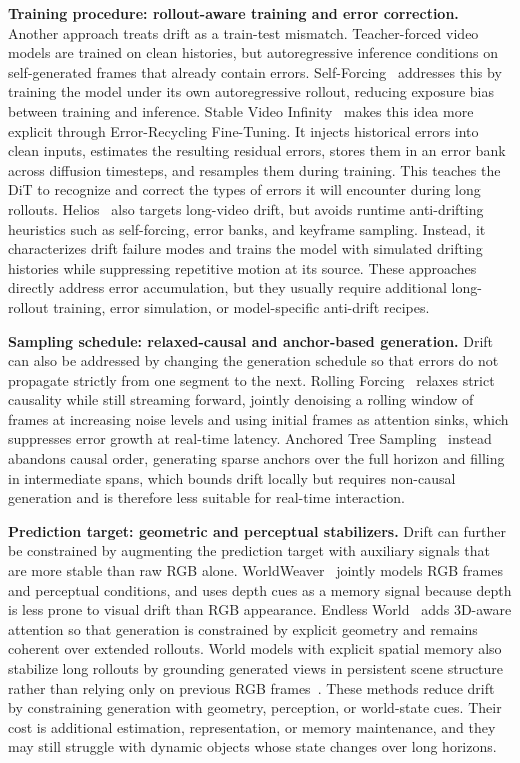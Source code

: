 \textbf{Training procedure: rollout-aware training and error correction.}
Another approach treats drift as a train-test mismatch.
Teacher-forced video models are trained on clean histories, but autoregressive inference conditions on self-generated frames that already contain errors.
Self-Forcing~\cite{huang2025selfforcing} addresses this by training the model under its own autoregressive rollout, reducing exposure bias between training and inference.
Stable Video Infinity~\cite{li2025stablevideoinfinity} makes this idea more explicit through Error-Recycling Fine-Tuning.
It injects historical errors into clean inputs, estimates the resulting residual errors, stores them in an error bank across diffusion timesteps, and resamples them during training.
This teaches the DiT to recognize and correct the types of errors it will encounter during long rollouts.
Helios~\cite{yuan2026helios} also targets long-video drift, but avoids runtime anti-drifting heuristics such as self-forcing, error banks, and keyframe sampling.
Instead, it characterizes drift failure modes and trains the model with simulated drifting histories while suppressing repetitive motion at its source.
These approaches directly address error accumulation, but they usually require additional long-rollout training, error simulation, or model-specific anti-drift recipes.

\textbf{Sampling schedule: relaxed-causal and anchor-based generation.}
Drift can also be addressed by changing the generation schedule so that errors do not propagate strictly from one segment to the next.
Rolling Forcing~\cite{liu2025rollingforcing} relaxes strict causality while still streaming forward, jointly denoising a rolling window of frames at increasing noise levels and using initial frames as attention sinks, which suppresses error growth at real-time latency.
Anchored Tree Sampling~\cite{bendel2026anchoredtreesampling} instead abandons causal order, generating sparse anchors over the full horizon and filling in intermediate spans, which bounds drift locally but requires non-causal generation and is therefore less suitable for real-time interaction.

\textbf{Prediction target: geometric and perceptual stabilizers.}
Drift can further be constrained by augmenting the prediction target with auxiliary signals that are more stable than raw RGB alone.
WorldWeaver~\cite{liu2025worldweaver} jointly models RGB frames and perceptual conditions, and uses depth cues as a memory signal because depth is less prone to visual drift than RGB appearance.
Endless World~\cite{zhang2025endlessworld} adds 3D-aware attention so that generation is constrained by explicit geometry and remains coherent over extended rollouts.
World models with explicit spatial memory also stabilize long rollouts by grounding generated views in persistent scene structure rather than relying only on previous RGB frames~\cite{wu2025longtermspatialmemory,wang2025evoworld,zhao2025spatia}.
These methods reduce drift by constraining generation with geometry, perception, or world-state cues.
Their cost is additional estimation, representation, or memory maintenance, and they may still struggle with dynamic objects whose state changes over long horizons.

